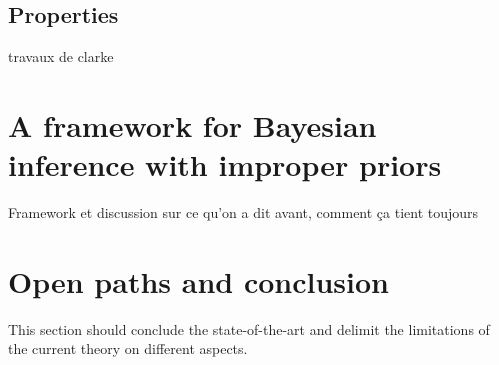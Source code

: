 \subsection{Properties}


travaux de clarke



\section{A framework for Bayesian inference with improper priors}

Framework et discussion sur ce qu'on a dit avant, comment ça tient toujours

\section{Open paths and conclusion}


This section should conclude the state-of-the-art and delimit the limitations of the current theory on different aspects. 













